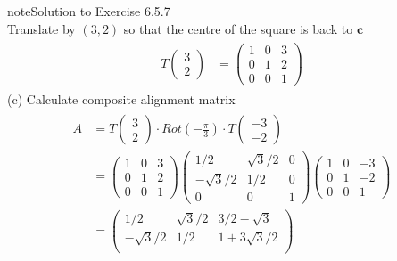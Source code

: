 \documentclass[letterpaper,10pt,english]{jupyterBook}
\begin{document}
\begin{sphinxadmonition}{note}{Solution to Exercise 6.5.7}
\begin{equation*}
\end{equation*}
\sphinxAtStartPar
Translate by \((3, 2)\) so that the centre of the square is back to \(\mathbf{c}\)
\begin{equation*}
\begin{split} \begin{align*}
    T \begin{pmatrix} 3 \\ 2 \end{pmatrix} &= 
    \begin{pmatrix}
        1 & 0 & 3 \\
        0 & 1 & 2 \\
        0 & 0 & 1
    \end{pmatrix}
\end{align*} \end{split}
\end{equation*}
\sphinxAtStartPar
(c) Calculate composite alignment matrix
\begin{equation*}
\begin{split} \begin{align*}
    A &= T \begin{pmatrix} 3 \\ 2 \end{pmatrix} \cdot Rot\left(-\frac{\pi}{3}\right) \cdot T \begin{pmatrix} -3 \\ -2 \end{pmatrix} \\
    &= \begin{pmatrix}
        1 & 0 & 3 \\
        0 & 1 & 2 \\
        0 & 0 & 1
    \end{pmatrix}
    \begin{pmatrix}
        1/2 & \sqrt{3}/2 & 0 \\
        -\sqrt{3}/2 & 1/2 & 0 \\
        0 & 0 & 1
    \end{pmatrix}
    \begin{pmatrix}
        1 & 0 & -3 \\
        0 & 1 & -2 \\
        0 & 0 & 1 
    \end{pmatrix} \\
    &= \begin{pmatrix}
        1/2 & \sqrt{3}/2 & 3/2 - \sqrt{3} \\
        -\sqrt{3}/2 & 1/2 & 1 + 3\sqrt{3}/2 \\

\end{pmatrix}
\end{align*}
\end{split}
\end{equation*}
\end{sphinxadmonition}
\end{document}
